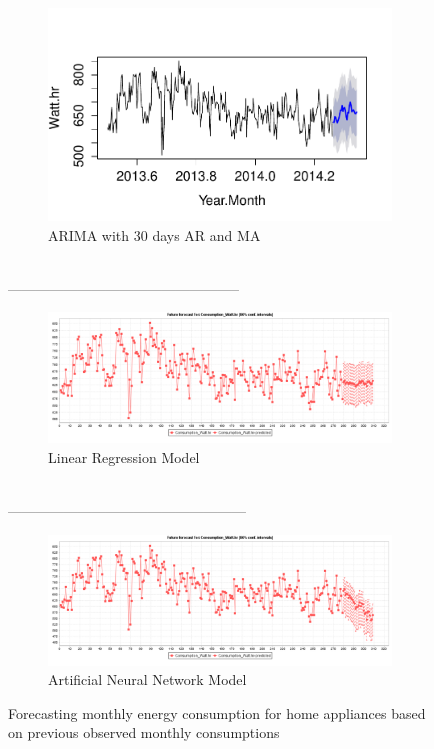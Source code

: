 \begin{figure}
        \centering
        \begin{subfigure}[b]{\textwidth}
                \includegraphics[width=\textwidth]{images/arima.pdf}
                \caption{ARIMA with 30 days AR and MA}
                \label{fig:arima}
        \end{subfigure}
        \\--------------------------------------------------
        
        
        \begin{subfigure}[b]{\textwidth}
                \includegraphics[width=\textwidth]{images/lr.pdf}
                \caption{Linear Regression Model}
                \label{fig:lr}
        \end{subfigure}
        \\---------------------------------------------------
        
        
        \begin{subfigure}[b]{\textwidth}
                \includegraphics[width=\textwidth]{images/ann.pdf}
                \caption{Artificial Neural Network Model}
                \label{fig:ann}
        \end{subfigure}
             \caption{Forecasting monthly energy consumption for home appliances based on previous observed monthly consumptions}\label{fig:predicted}
\end{figure}

